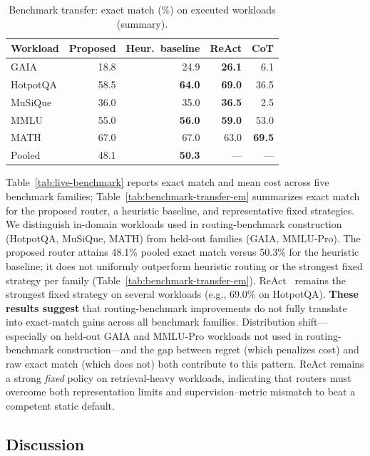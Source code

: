 \begin{table}[t]
  \centering
  \footnotesize
  \setlength{\tabcolsep}{2pt}
  \caption{Benchmark transfer: exact match (\%) on executed workloads (summary).}
  \label{tab:benchmark-transfer-em}
  \label{tab:deployment-em}
  \begin{tabular}{@{}lrrrr@{}}
    \toprule
    Workload & Proposed & Heur.\ baseline & ReAct & CoT \\
    \midrule
    GAIA & 18.8 & 24.9 & \textbf{26.1} & 6.1 \\
    HotpotQA & 58.5 & \textbf{64.0} & \textbf{69.0} & 36.5 \\
    MuSiQue & 36.0 & 35.0 & \textbf{36.5} & 2.5 \\
    MMLU & 55.0 & \textbf{56.0} & \textbf{59.0} & 53.0 \\
    MATH & 67.0 & 67.0 & 63.0 & \textbf{69.5} \\
    Pooled & 48.1 & \textbf{50.3} & {---} & {---} \\
    \bottomrule
  \end{tabular}
\end{table}

Table~\ref{tab:live-benchmark} reports exact match and mean cost across five benchmark
families; Table~\ref{tab:benchmark-transfer-em} summarizes exact match for the proposed
router, a heuristic baseline, and representative fixed strategies.
We distinguish in-domain workloads used in routing-benchmark construction (HotpotQA,
MuSiQue, MATH) from held-out families (GAIA, MMLU-Pro).
The proposed router attains 48.1\% pooled exact match versus 50.3\% for the heuristic
baseline; it does not uniformly outperform heuristic routing or the strongest fixed strategy
per family (Table~\ref{tab:benchmark-transfer-em}).
ReAct~\citep{yao2023react} remains the strongest fixed strategy on several workloads
(e.g., 69.0\% on HotpotQA).
\textbf{These results suggest} that routing-benchmark improvements do not fully translate into
exact-match gains across all benchmark families.
Distribution shift---especially on held-out GAIA and MMLU-Pro workloads not used in routing-benchmark
construction---and the gap between regret (which penalizes cost) and raw exact match (which does
not) both contribute to this pattern.
ReAct remains a strong \emph{fixed} policy on retrieval-heavy workloads, indicating that routers
must overcome both representation limits and supervision--metric mismatch to beat a competent
static default.

\subsection{Discussion}
\label{sec:discussion}

